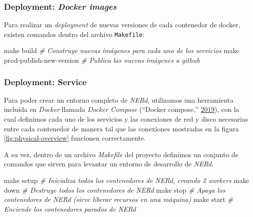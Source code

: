 \documentclass[12pt,a4paper,]{scrartcl}
\newenvironment{Shaded}{\begin{snugshade}}{\end{snugshade}}
\newcommand{\CommentTok}[1]{\textcolor[rgb]{0.56,0.35,0.01}{\textit{#1}}}
\newcommand{\FunctionTok}[1]{\textcolor[rgb]{0.00,0.00,0.00}{#1}}
\newcommand{\NormalTok}[1]{#1}
\begin{document}
\hypertarget{deployment-docker-images}{%
\subsubsection{\texorpdfstring{Deployment: \emph{Docker images}}{Deployment: Docker images}}\label{deployment-docker-images}}

Para realizar un \emph{deployment} de nuevas versiones de cada contenedor de docker, existen comandos dentro del archivo \texttt{Makefile}:

\begin{Shaded}
\begin{Highlighting}[]
\FunctionTok{make}\NormalTok{ build }\CommentTok{# Construye nuevas imágenes para cada uno de los servicios}
\FunctionTok{make}\NormalTok{ prod-publish-new-version }\CommentTok{# Publica las nuevas imágenes a github}
\end{Highlighting}
\end{Shaded}

\hypertarget{deployment-service}{%
\subsubsection{Deployment: Service}\label{deployment-service}}

Para poder crear un entorno completo de \emph{NERd}, utilizamos una herramienta incluída en \emph{Docker} llamada \emph{Docker Compose} (``Docker compose,'' \protect\hyperlink{ref-dockercompose}{2019}), con la cual definimos cada uno de los servicios y las conexiones de red y disco necesarias entre cada contenedor de manera tal que las conexiones mostradas en la figura \ref{fig:physical-overview} funcionen correctamente.

A su vez, dentro de un archivo \emph{Makefile} del proyecto definimos un conjunto de comandos que sirven para levantar un entorno de desarrollo de \emph{NERd}.

\begin{Shaded}
\begin{Highlighting}[]
\FunctionTok{make}\NormalTok{ setup }\CommentTok{# Inicializa todos los contenedores de NERd, creando 2 workers}
\FunctionTok{make}\NormalTok{ down }\CommentTok{# Destruye todos los contenedores de NERd}
\FunctionTok{make}\NormalTok{ stop }\CommentTok{# Apaga los contenedores de NERd (sirve liberar recursos en una máquina)}
\FunctionTok{make}\NormalTok{ start }\CommentTok{# Enciende los contenedores parados de NERd}
\end{Highlighting}
\end{Shaded}
\end{document}
